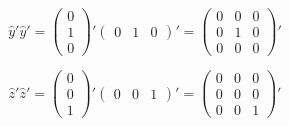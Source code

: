 \documentclass[letterpaper,twocolumn,amsmath,amssymb,prb]{revtex4-1}
\begin{document}
\begin{widetext}
\begin{displaymath}{\hat{y}'\hat{y}'= \left(\begin{array}{c} 0 \\ 1 \\ 0 \end{array}\right)'\left(\begin{array}{ccc} 0 & 1 & 0 \end{array}\right)'=\left(\begin{array}{ccc} 0 & 0 & 0 \\ 0 & 1 & 0 \\ 0 & 0 & 0 \end{array}\right)'}\end{displaymath}

\begin{displaymath}{\hat{z}'\hat{z}'= \left(\begin{array}{c} 0 \\ 0 \\ 1 \end{array}\right)'\left(\begin{array}{ccc} 0 & 0 & 1 \end{array}\right)'=\left(\begin{array}{ccc} 0 & 0 & 0 \\ 0 & 0 & 0 \\ 0 & 0 & 1 \end{array}\right)'}\end{displaymath}


\end{widetext}
\end{document}

